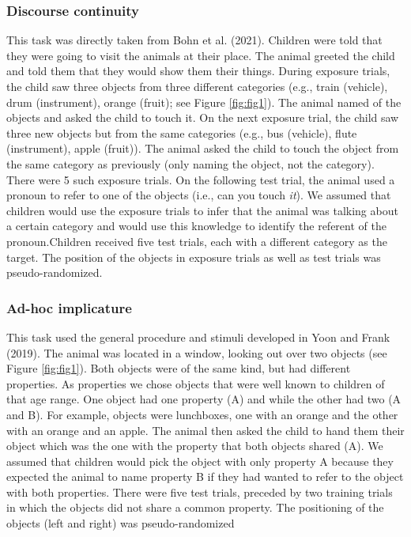 \documentclass[
  english,
  man,floatsintext]{apa6}
\begin{document}
\hypertarget{discourse-continuity}{%
\subsubsection{Discourse continuity}\label{discourse-continuity}}

This task was directly taken from Bohn et al. (2021). Children were told that they were going to visit the animals at their place. The animal greeted the child and told them that they would show them their things. During exposure trials, the child saw three objects from three different categories (e.g., train (vehicle), drum (instrument), orange (fruit); see Figure \ref{fig:fig1}). The animal named of the objects and asked the child to touch it. On the next exposure trial, the child saw three new objects but from the same categories (e.g., bus (vehicle), flute (instrument), apple (fruit)). The animal asked the child to touch the object from the same category as previously (only naming the object, not the category). There were 5 such exposure trials. On the following test trial, the animal used a pronoun to refer to one of the objects (i.e., can you touch \emph{it}). We assumed that children would use the exposure trials to infer that the animal was talking about a certain category and would use this knowledge to identify the referent of the pronoun.Children received five test trials, each with a different category as the target. The position of the objects in exposure trials as well as test trials was pseudo-randomized.

\hypertarget{ad-hoc-implicature}{%
\subsubsection{Ad-hoc implicature}\label{ad-hoc-implicature}}

This task used the general procedure and stimuli developed in Yoon and Frank (2019). The animal was located in a window, looking out over two objects (see Figure \ref{fig:fig1}). Both objects were of the same kind, but had different properties. As properties we chose objects that were well known to children of that age range. One object had one property (A) and while the other had two (A and B). For example, objects were lunchboxes, one with an orange and the other with an orange and an apple. The animal then asked the child to hand them their object which was the one with the property that both objects shared (A). We assumed that children would pick the object with only property A because they expected the animal to name property B if they had wanted to refer to the object with both properties. There were five test trials, preceded by two training trials in which the objects did not share a common property. The positioning of the objects (left and right) was pseudo-randomized
\end{document}
